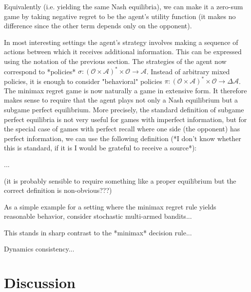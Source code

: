 \documentclass[a4paper]{article}
\newcommand{\SP}[1]{\Delta #1}
\newcommand{\Act}{\mathcal{A}}
\newcommand{\Per}{\mathcal{O}}
\newcommand{\His}{(\Per \times \Act)^*}
\begin{document}
Equivalently (i.e. yielding the same Nash equilibria), we can make it a zero-sum game by taking negative regret to be the agent's utility function (it makes no difference since the other term depends only on the opponent).

In most interesting settings the agent's strategy involves making a sequence of actions between which it receives additional information. This can be expressed using the notation of the previous section. The strategies of the agent now correspond to *policies* ${\sigma: \His \times \Per \rightarrow \Act}$. Instead of arbitrary mixed policies, it is enough to consider "behavioral" policies ${\pi: \His \times \Per \rightarrow \SP{\Act}}$. The minimax regret game is now naturally a game in extensive form. It therefore makes sense to require that the agent plays not only a Nash equilibrium but a subgame perfect equilibrium. More precisely, the standard definition of subgame perfect equilibria is not very useful for games with imperfect information, but for the special case of games with perfect recall where one side (the opponent) has perfect information, we can use the following definition (*I don't know whether this is standard, if it is I would be grateful to receive a source*):

... 

(it is probably sensible to require something like a proper equilibrium but the correct definition is non-obvious???)

As a simple example for a setting where the minimax regret rule yields reasonable behavior, consider stochastic multi-armed bandits...

This stands in sharp contrast to the *minimax* decision rule...

Dynamics consistency...

\section{Discussion}
\end{document}
